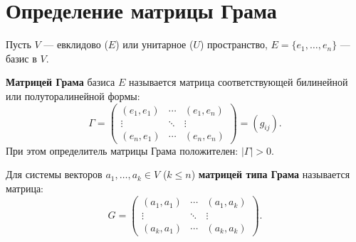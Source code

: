 \section{Определение матрицы Грама}

\begin{definition}
Пусть $V$ --- евклидово ($E$) или унитарное ($U$) пространство, $E = \{e_1, \ldots, e_n\}$ --- базис в $V$.

\textbf{Матрицей Грама} базиса $E$ называется матрица соответствующей билинейной или полуторалинейной формы:
\[
\Gamma = \begin{pmatrix}
(e_1, e_1) & \cdots & (e_1, e_n) \\
\vdots & \ddots & \vdots \\
(e_n, e_1) & \cdots & (e_n, e_n)
\end{pmatrix} = (g_{ij}).
\]
При этом определитель матрицы Грама положителен: $|\Gamma| > 0$.

Для системы векторов $a_1, \ldots, a_k \in V$ ($k \leq n$) \textbf{матрицей типа Грама} называется матрица:
\[
G = \begin{pmatrix}
(a_1, a_1) & \cdots & (a_1, a_k) \\
\vdots & \ddots & \vdots \\
(a_k, a_1) & \cdots & (a_k, a_k)
\end{pmatrix}.
\]
\end{definition}
